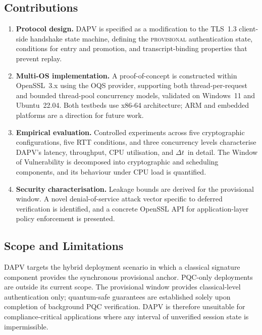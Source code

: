 \documentclass[preprint,10pt,3p]{elsarticle}
\newcommand{\Dt}{\ensuremath{\Delta t}}
\begin{document}
\subsection{Contributions}

\begin{enumerate}[label=(\arabic*), leftmargin=*]
\item \textbf{Protocol design.}  DAPV is specified as a modification to the
  TLS~1.3 client-side handshake state machine, defining the
  \textsc{provisional} authentication state, conditions for entry and
  promotion, and transcript-binding properties that prevent replay.

\item \textbf{Multi-OS implementation.}  A proof-of-concept is constructed
  within OpenSSL~3.x using the OQS provider, supporting both thread-per-request
  and bounded thread-pool concurrency models, validated on Windows~11 and
  Ubuntu~22.04.  Both testbeds use x86-64 architecture; ARM and embedded
  platforms are a direction for future work.

\item \textbf{Empirical evaluation.}  Controlled experiments across five
  cryptographic configurations, five RTT conditions, and three concurrency
  levels characterise DAPV's latency, throughput, CPU utilisation, and \Dt\
  in detail.  The Window of Vulnerability is decomposed into cryptographic
  and scheduling components, and its behaviour under CPU load is quantified.

\item \textbf{Security characterisation.}  Leakage bounds are derived for the
  provisional window.  A novel denial-of-service attack vector specific to
  deferred verification is identified, and a concrete OpenSSL API for
  application-layer policy enforcement is presented.
\end{enumerate}

\subsection{Scope and Limitations}

DAPV targets the hybrid deployment scenario in which a classical signature
component provides the synchronous provisional anchor.  PQC-only deployments
are outside its current scope.  The provisional window provides classical-level
authentication only; quantum-safe guarantees are established solely upon
completion of background PQC verification.  DAPV is therefore unsuitable for
compliance-critical applications where any interval of unverified session state
is impermissible.
\end{document}
